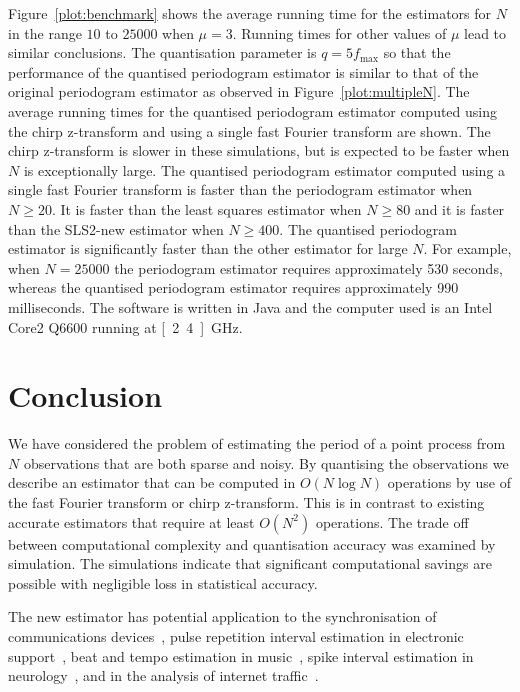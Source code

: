 \documentclass[10pt,twocolumn,twoside]{IEEEtran}
\begin{document}
Figure~\ref{plot:benchmark} shows the average running time for the estimators for $N$ in the range $10$ to $25000$ when $\mu=3$.  Running times for other values of $\mu$ lead to similar conclusions.  The quantisation parameter is $q = 5 f_{\text{max}}$ so that the performance of the quantised periodogram estimator is similar to that of the original periodogram estimator as observed in Figure~\ref{plot:multipleN}.  The average running times for the quantised periodogram estimator computed using the chirp z-transform and using a single fast Fourier transform are shown.  The chirp z-transform is slower in these simulations, but is expected to be faster when $N$ is exceptionally large.  The quantised periodogram estimator computed using a single fast Fourier transform is faster than the periodogram estimator when $N \geq 20$.  It is faster than the least squares estimator when $N \geq 80$ and it is faster than the SLS2-new estimator when $N \geq 400$.  The quantised periodogram estimator is significantly faster than the other estimator for large $N$.  For example, when $N = 25000$ the periodogram estimator requires approximately 530 seconds, whereas the quantised periodogram estimator requires approximately 990 milliseconds.  The software is written in Java and the computer used is an Intel Core2 Q6600 running at \unit[2.4]{GHz}. 

 

\section{Conclusion}

We have considered the problem of estimating the period of a point process from $N$ observations that are both sparse and noisy.  By quantising the observations we describe an estimator that can be computed in $O(N\log N)$ operations by use of the fast Fourier transform or chirp z-transform.  This is in contrast to existing accurate estimators that require at least $O(N^2)$ operations.  The trade off between computational complexity and quantisation accuracy was examined by simulation.  The simulations indicate that significant computational savings are possible with negligible loss in statistical accuracy.

The new estimator has potential application to the synchronisation of communications devices~\cite{Fogel1988,Fogel1989_bit_synch_zero_crossings}, pulse repetition interval estimation in electronic support~\cite{EltonGray_puilse_train_rader_1994,Gray_more_pri_1994,Clarkson_thesis,clarkson_estimate_period_pulse_train_1996,Hauochan_pri_2012}, beat and tempo estimation in music~\cite{dixon_beat_extraction_2001}, spike interval estimation in neurology~\cite{Arnett_neuro_pri_1976,Brillinger_spike_trains_1988,Rossoni200630}, and in the analysis of internet traffic~\cite{He_detecting_periodic_patterns_in_internet_2006,5585849,5947313}.


\small

\end{document}
